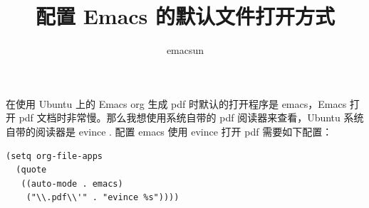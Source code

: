 \documentclass[10pt,a4paper,UTF8]{article}
\author{emacsun}
\date{}
\title{配置 Emacs 的默认文件打开方式}
\begin{document}
\maketitle
\tableofcontents
{}
在使用 Ubuntu 上的 Emacs org 生成 pdf 时默认的打开程序是 emacs，Emacs 打开 pdf 文档时非常慢。那么我想使用系统自带的  pdf 阅读器来查看，Ubuntu 系统自带的阅读器是 evince . 配置 emacs 使用 evince 打开 pdf 需要如下配置：

\lstset{language=Lisp,label= ,caption= ,captionpos=b,numbers=none}
\begin{lstlisting}
(setq org-file-apps
  (quote
   ((auto-mode . emacs)
    ("\\.pdf\\'" . "evince %s"))))
\end{lstlisting}
\end{document}
